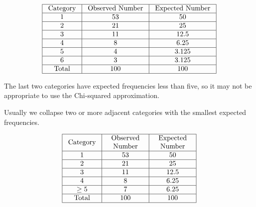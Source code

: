 \[ \begin{array}{|c|c|c|}
        \hline \text { Category } & \text { Observed Number } & \text { Expected Number } \\
        \hline 1                  & 53                        & 50                        \\
        \hline 2                  & 21                        & 25                        \\
        \hline 3                  & 11                        & 12.5                      \\
        \hline 4                  & 8                         & 6.25                      \\
        \hline 5                  & 4                         & 3.125                     \\
        \hline 6                  & 3                         & 3.125                     \\
        \hline \text { Total }    & 100                       & 100                       \\
        \hline
    \end{array} \]

The last two categories have expected frequencies less than five, so it may not be
appropriate to use the Chi-squared approximation.

Usually we collapse two or more adjacent categories with the smallest expected frequencies.

\[ \begin{array}{|c|c|c|}
        \hline \text { Category } & \begin{array}{c}
            \text { Observed } \\
            \text { Number }
        \end{array} & \begin{array}{c}
            \text { Expected } \\
            \text { Number }
        \end{array} \\
        \hline 1                  & 53                         & 50                         \\
        \hline 2                  & 21                         & 25                         \\
        \hline 3                  & 11                         & 12.5                       \\
        \hline 4                  & 8                          & 6.25                       \\
        \hline \geq 5             & 7                          & 6.25                       \\
        \hline \text { Total }    & 100                        & 100                        \\
        \hline
    \end{array} \]

